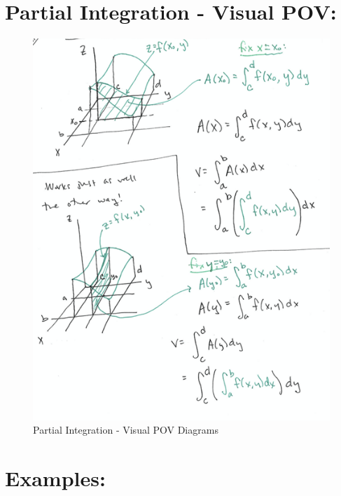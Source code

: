 \section*{Partial Integration - Visual POV:}
\begin{figure}[hbtp]
\includegraphics[height=.5\textheight]{Ch12s1-Slicing.png}
\caption{Partial Integration - Visual POV Diagrams}
\end{figure}



\section*{Examples:}


